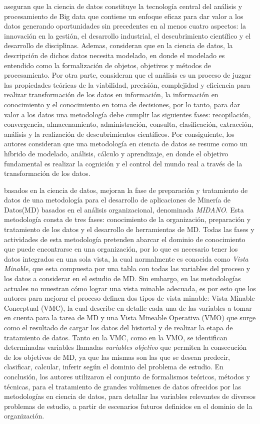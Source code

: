 \citep{Xu2021} aseguran que la ciencia de datos constituye la tecnología central del análisis y procesamiento de Big data que contiene un enfoque eficaz para dar valor a los datos generando oportunidades sin precedentes en al menos cuatro aspectos: la innovación en la gestión, el desarrollo industrial, el descubrimiento científico y el desarrollo de disciplinas. Ademas, consideran que en la ciencia de datos, la descripción de dichos datos necesita modelado, en donde el modelado es entendido como la formalización de objetos, objetivos y métodos de procesamiento. Por otra parte, consideran que el análisis es un proceso de juzgar las propiedades teóricas de la viabilidad, precisión, complejidad y eficiencia para realizar transformación de los datos en información, la información en conocimiento y  el conocimiento en toma de decisiones, por lo tanto, para dar valor a los datos una metodología debe cumplir las siguientes fases: recopilación, convergencia, almacenamiento, administración, consulta, clasificación, extracción, análisis  y la realización de descubrimientos científicos. Por consiguiente, los autores consideran que una  metodología en ciencia de datos se resume como un híbrido de modelado, análisis, cálculo y aprendizaje, en donde el objetivo fundamental es realizar la cognición y el control del mundo real a través de  la transformación de los datos.

\citep{Pacheco2014} basados en la ciencia de datos, mejoran la fase de preparación y tratamiento de datos de una metodología para el desarrollo de aplicaciones de Minería de Datos(MD) basados en el análisis organizacional, denominada \textit{MIDANO}. Esta metodología consta de tres fases: conocimiento de la organización,  preparación y tratamiento de los datos y el desarrollo de herramientas de MD. Todas las fases y actividades de esta metodología pretenden abarcar el dominio de conocimiento que puede encontrarse en una organización, por lo que es necesario tener los datos integrados en una sola vista, la cual normalmente es conocida como \textit{Vista Minable}, que esta compuesta por una tabla con todas las variables del proceso y los datos a considerar en el estudio de MD. Sin embargo, en las metodologías actuales no muestran cómo lograr una vista minable adecuada, es por esto que los autores para mejorar el proceso definen dos tipos de vista minable: Vista Minable Conceptual (VMC), la cual describe en detalle cada una de las variables a tomar en cuenta para la tarea de MD  y una Vista Mineable Operativa (VMO) que surge como el resultado de cargar los datos del historial y de realizar la etapa de tratamiento de datos. Tanto en la VMC, como en la VMO, se identifican determinadas variables llamadas \textit{variables objetivo} que permiten la consecución de los objetivos de MD, ya que las mismas son las que se desean predecir, clasificar, calcular, inferir según el dominio del problema de estudio. En conclusión, los autores utilizaron el conjunto de formalismos teóricos, métodos y técnicas, para el tratamiento de grandes volúmenes de datos ofrecidos por las metodologías en ciencia de datos, para detallar las variables relevantes de diversos problemas de estudio, a partir de escenarios futuros definidos en el dominio de la organización.

